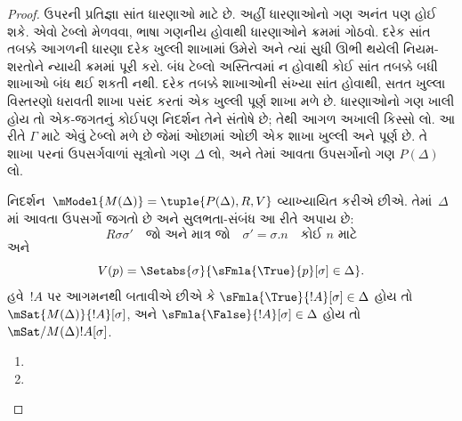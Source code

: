 \begin{proof}
ઉપરની પ્રતિજ્ઞા સાંત ધારણાઓ માટે છે. અહીં ધારણાઓનો ગણ
અનંત પણ હોઈ શકે. એવો ટેબ્લો મેળવવા, ભાષા ગણનીય
હોવાથી ધારણાઓને ક્રમમાં
ગોઠવો. દરેક સાંત તબક્કે આગળની ધારણા દરેક ખુલ્લી શાખામાં
ઉમેરો અને ત્યાં સુધી ઊભી થયેલી નિયમ-શરતોને ન્યાયી ક્રમમાં
પૂરી કરો. બંધ ટેબ્લો અસ્તિત્વમાં ન હોવાથી કોઈ સાંત
તબક્કે બધી શાખાઓ બંધ થઈ શકતી નથી. દરેક તબક્કે શાખાઓની
સંખ્યા સાંત હોવાથી, સતત ખુલ્લા વિસ્તરણો ધરાવતી શાખા
પસંદ કરતાં એક ખુલ્લી પૂર્ણ શાખા મળે છે.
ધારણાઓનો ગણ ખાલી હોય તો એક-જગતનું કોઈપણ નિદર્શન તેને
સંતોષે છે; તેથી આગળ અખાલી કિસ્સો લો.
આ રીતે $\Gamma$ માટે એવું ટેબ્લો મળે છે જેમાં
ઓછામાં ઓછી એક શાખા ખુલ્લી અને પૂર્ણ છે. તે શાખા પરનાં
ઉપસર્ગવાળાં સૂત્રોનો ગણ $\Delta$ લો, અને તેમાં
આવતા ઉપસર્ગોનો ગણ $P(\Delta)$ લો.

નિદર્શન~$\mModel{M(\Delta)} = \tuple{P(\Delta), R, V}$
વ્યાખ્યાયિત કરીએ છીએ. તેમાં~$\Delta$માં આવતા ઉપસર્ગો
જગતો છે અને સુલભતા-સંબંધ આ રીતે અપાય છે:
\[
R\sigma\sigma' \quad \text{જો અને માત્ર જો} \quad
\sigma'=\sigma.n \quad \text{કોઈ~$n$ માટે}
\]
અને
\[
V(p) = \Setabs{\sigma}{\sFmla{\True}{p}[\sigma] \in \Delta}.
\]
હવે~$!A$ પર આગમનથી બતાવીએ છીએ કે
$\sFmla{\True}{!A}[\sigma] \in \Delta$ હોય તો
$\mSat{M(\Delta)}{!A}[\sigma]$, અને
$\sFmla{\False}{!A}[\sigma] \in \Delta$ હોય તો
$\mSat/{M(\Delta)}{!A}[\sigma]$.

\begin{enumerate}
  \item {}
  \item {}
\end{enumerate}
\end{proof}
